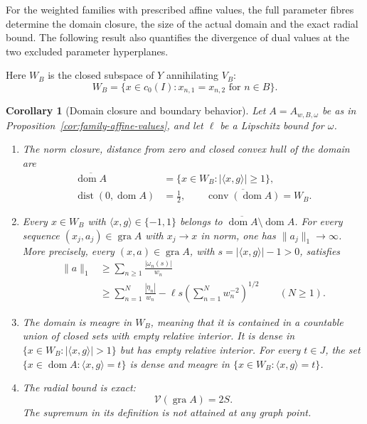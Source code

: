 \documentclass[11pt]{article}
\newcommand{\gra}{\operatorname{gra}}
\newcommand{\dom}{\operatorname{dom}}
\newcommand{\pair}[2]{\langle #1,#2\rangle}
\newtheorem{corollary}{Corollary}
\theoremstyle{definition}
\theoremstyle{remark}
\newcommand{\dist}{\operatorname{dist}}
\begin{document}
For the weighted families with prescribed affine values, the full parameter fibres determine the domain closure, the size of the actual domain and the exact radial bound. The following result also quantifies the divergence of dual values at the two excluded parameter hyperplanes.

Here $W_B$ is the closed subspace of $Y$ annihilating $V_B$:
\begin{equation}
W_B=\{x\in c_0(I):x_{n,1}=x_{n,2}\text{ for }n\in B\}.
\label{eq:family-primal-subspace}
\end{equation}

\begin{corollary}[Domain closure and boundary behavior]
\label{cor:family-domain-geometry}
Let $A=A_{w,B,\omega}$ be as in Proposition~\ref{cor:family-affine-values}, and let $\ell$ be a Lipschitz bound for $\omega$.
\begin{enumerate}
\item The norm closure, distance from zero and closed convex hull of the domain are
\begin{equation}
\begin{aligned}
\overline{\dom A}&=\{x\in W_B:|\pair{x}{g}|\ge1\},\\
\dist(0,\dom A)&=\frac12,\qquad
\overline{\operatorname{conv}(\dom A)}=W_B.
\end{aligned}
\label{eq:family-domain-closure}
\end{equation}
\item Every $x\in W_B$ with $\pair{x}{g}\in\{-1,1\}$ belongs to $\overline{\dom A}\setminus\dom A$. For every sequence $(x_j,a_j)\in\gra A$ with $x_j\to x$ in norm, one has $\|a_j\|_1\to\infty$. More precisely, every $(x,a)\in\gra A$, with $s=|\pair{x}{g}|-1>0$, satisfies
\begin{equation}
\begin{aligned}
\|a\|_1&\ge\sum_{n\ge1}\frac{|\omega_n(s)|}{w_n}\\
&\ge\sum_{n=1}^N\frac{|\eta_n|}{w_n}
-\ell s\left(\sum_{n=1}^Nw_n^{-2}\right)^{1/2}
\qquad(N\ge1).
\end{aligned}
\label{eq:family-boundary-bound}
\end{equation}
\item The domain is meagre in $W_B$, meaning that it is contained in a countable union of closed sets with empty relative interior. It is dense in $\{x\in W_B:|\pair{x}{g}|>1\}$ but has empty relative interior. For every $t\in J$, the set $\{x\in\dom A:\pair{x}{g}=t\}$ is dense and meagre in $\{x\in W_B:\pair{x}{g}=t\}$.
\item The radial bound is exact:
\begin{equation}
\mathcal V(\gra A)=2S.
\label{eq:family-exact-radial}
\end{equation}
The supremum in its definition is not attained at any graph point.
\end{enumerate}
\end{corollary}
\end{document}
